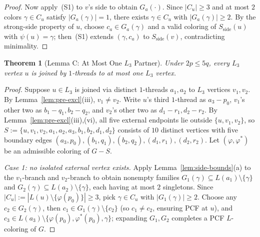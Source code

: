 \documentclass[11pt,a4paper]{article}
\newtheorem{theorem}{Theorem}[section]
\theoremstyle{definition}
\begin{document}
\begin{proof}
Now apply~(S1) to $v$'s side to obtain $G_a(\cdot)$. Since $|C_u| \ge 3$ and at most $2$ colors $\gamma \in C_u$ satisfy $|G_a(\gamma)| = 1$, there exists $\gamma \in C_u$ with $|G_a(\gamma)| \ge 2$. By the strong-side property of $u$, choose $c_a \in G_a(\gamma)$ and a valid coloring of $S_{\mathrm{side}}(u)$ with $\psi(u) = \gamma$; then~(S1) extends $(\gamma, c_a)$ to $S_{\mathrm{side}}(v)$, contradicting minimality.
\end{proof}

\begin{theorem}[Lemma C: At Most One $L_3$ Partner]\label{thm:L3-at-most-one}
Under $2p \le 5q$, every $L_3$ vertex $u$ is joined by $1$-threads to at most one $L_3$ vertex.
\end{theorem}

\begin{proof}
Suppose $u \in L_3$ is joined via distinct $1$-threads $a_1, a_2$ to $L_3$ vertices $v_1, v_2$. By Lemma~\ref{lem:pre-excl}(iii), $v_1 \neq v_2$. Write $u$'s third $1$-thread as $a_3 - p_0$, $v_1$'s other two as $b_1 - q_1, b_2 - q_2$, and $v_2$'s other two as $d_1 - r_1, d_2 - r_2$. By Lemma~\ref{lem:pre-excl}(iii),(vi), all five external endpoints lie outside $\{u, v_1, v_2\}$, so $S := \{u, v_1, v_2, a_1, a_2, a_3, b_1, b_2, d_1, d_2\}$ consists of $10$ distinct vertices with five boundary edges $(a_3, p_0), (b_1, q_1), (b_2, q_2), (d_1, r_1), (d_2, r_2)$. Let $(\varphi, \varphi^*)$ be an admissible coloring of $G - S$.

\emph{Case 1: no isolated external vertex exists.} Apply Lemma~\ref{lem:side-bounds}(a) to the $v_1$-branch and $v_2$-branch to obtain nonempty families $G_1(\gamma) \subseteq L(a_1) \setminus \{\gamma\}$ and $G_2(\gamma) \subseteq L(a_2) \setminus \{\gamma\}$, each having at most $2$ singletons. Since $|C_u| := |L(u) \setminus \{\varphi(p_0)\}| \ge 3$, pick $\gamma \in C_u$ with $|G_1(\gamma)| \ge 2$. Choose any $c_2 \in G_2(\gamma)$, then $c_1 \in G_1(\gamma) \setminus \{c_2\}$ (so $c_1 \neq c_2$, ensuring PCF at $u$), and $c_3 \in L(a_3) \setminus \{\varphi(p_0), \varphi^*(p_0), \gamma\}$; expanding $G_1, G_2$ completes a PCF $L$-coloring of $G$.


\end{proof}
\end{document}
